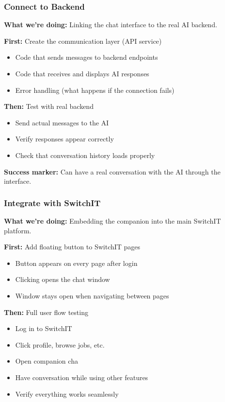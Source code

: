 \documentclass[12pt,a4paper]{article}
\begin{document}
\subsubsection{Connect to Backend}

\textbf{What we're doing:} Linking the chat interface to the real AI backend.

\textbf{First: } Create the communication layer (API service)
\begin{itemize}
  \item Code that sends messages to backend endpoints
  \item Code that receives and displays AI responses
  \item Error handling (what happens if the connection fails)
\end{itemize}

\textbf{Then:} Test with real backend
\begin{itemize}
  \item Send actual messages to the AI
  \item Verify responses appear correctly
  \item Check that conversation history loads properly
\end{itemize}

\textbf{Success marker:} Can have a real conversation with the AI through the interface.

\subsubsection{Integrate with SwitchIT}

\textbf{What we're doing:} Embedding the companion into the main SwitchIT platform.

\textbf{First:} Add floating button to SwitchIT pages
\begin{itemize}
  \item Button appears on every page after login
  \item Clicking opens the chat window
  \item Window stays open when navigating between pages
\end{itemize}

\textbf{Then:} Full user flow testing
\begin{itemize}
  \item Log in to SwitchIT
  \item Click profile, browse jobs, etc.
  \item Open companion cha
  \item Have conversation while using other features
  \item Verify everything works seamlessly
\end{itemize}
\end{document}
